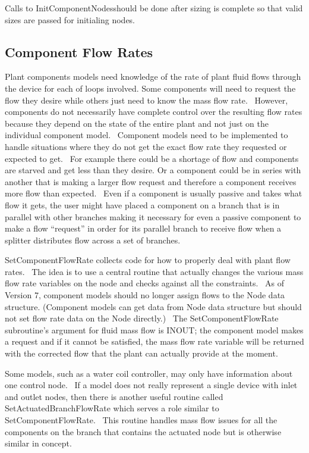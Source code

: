 Calls to InitComponentNodesshould be done after sizing is complete so that valid sizes are passed for initialing nodes.

\subsection{Component Flow Rates}\label{component-flow-rates}

Plant components models need knowledge of the rate of plant fluid flows through the device for each of loops involved. Some components will need to request the flow they desire while others just need to know the mass flow rate.~ However, components do not necessarily have complete control over the resulting flow rates because they depend on the state of the entire plant and not just on the individual component model.~ Component models need to be implemented to handle situations where they do not get the exact flow rate they requested or expected to get.~ For example there could be a shortage of flow and components are starved and get less than they desire. Or a component could be in series with another that is making a larger flow request and therefore a component receives more flow than expected.~ Even if a component is usually passive and takes what flow it gets, the user might have placed a component on a branch that is in parallel with other branches making it necessary for even a passive component to make a flow ``request'' in order for its parallel branch to receive flow when a splitter distributes flow across a set of branches.

SetComponentFlowRate collects code for how to properly deal with plant flow rates.~ The idea is to use a central routine that actually changes the various mass flow rate variables on the node and checks against all the constraints.~ As of Version 7, component models should no longer assign flows to the Node data structure. (Component models can get data from Node data structure but should not set flow rate data on the Node directly.)~ The SetComponentFlowRate subroutine's argument for fluid mass flow is INOUT; the component model makes a request and if it cannot be satisfied, the mass flow rate variable will be returned with the corrected flow that the plant can actually provide at the moment.

Some models, such as a water coil controller, may only have information about one control node.~ If a model does not really represent a single device with inlet and outlet nodes, then there is another useful routine called SetActuatedBranchFlowRate which serves a role similar to SetComponentFlowRate.~ This routine handles mass flow issues for all the components on the branch that contains the actuated node but is otherwise similar in concept.

